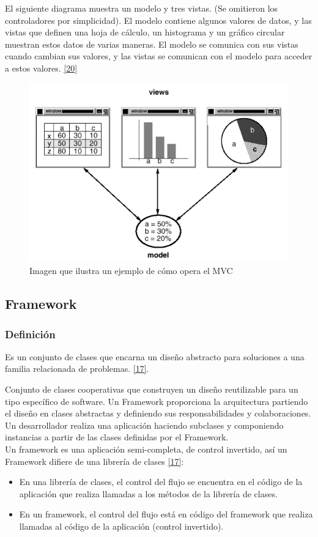 El siguiente diagrama muestra un modelo y tres vistas. (Se omitieron los controladores por simplicidad). El modelo contiene algunos valores de datos, y las vistas que definen una hoja de cálculo, un histograma y un gráfico circular muestran estos datos de varias maneras. El modelo se comunica con sus vistas cuando cambian sus valores, y las vistas se comunican con el modelo para acceder a estos valores. \hyperlink{b20}{[20]} 

\begin{figure}[H]
	\begin{center}
		\includegraphics[width=.65\textwidth]{images/marcoteorico/mvc2}
		\caption{Imagen que ilustra un ejemplo de cómo opera el MVC }
		\label{fig:mvc2}
	\end{center}
\end{figure}


\subsection{Framework}

\subsubsection{Definición}
Es un conjunto de clases que encarna un diseño abstracto para soluciones a una familia relacionada de problemas. \hyperlink{b17}{[17]}. 

Conjunto de clases cooperativas que construyen un diseño reutilizable para un tipo específico de software. Un Framework proporciona la arquitectura partiendo el diseño en clases abstractas y definiendo sus responsabilidades y colaboraciones. Un desarrollador realiza una aplicación haciendo subclases y componiendo instancias a partir de las clases definidas por el Framework. \\

Un framework es una aplicación semi-completa, de control invertido, así un Framework difiere de una librería de clases \hyperlink{b17}{[17]}:
\begin{itemize}
	\item En una librería de clases, el control del flujo se encuentra en el código de la aplicación que realiza llamadas a los métodos de la librería de clases.
	\item En un framework, el control del flujo está en código del framework que realiza llamadas al código de la aplicación (control invertido).
\end{itemize}

